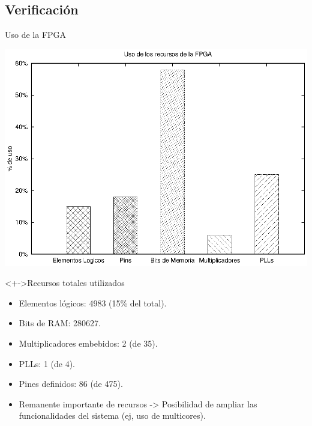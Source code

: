 \documentclass[xcolor=dvipsnames]{beamer}
\begin{document}
\subsection{Verificación}
\begin{frame}{Uso de la FPGA}

	\center	
	\includegraphics[scale=0.30]{figures/fpga.eps}  
	

   \begin{block}<+->{Recursos totales utilizados}	
    \begin{itemize}
	\scriptsize
     	\item Elementos lógicos: 4983 (15\% del total).
	\item Bits de RAM: 280627.
	\item Multiplicadores embebidos: 2 (de 35).
	\item PLLs: 1 (de 4).
	\item Pines definidos: 86 (de 475).
	\item Remanente importante de recursos -> Posibilidad de ampliar las funcionalidades del sistema (ej, uso de multicores).
    \end{itemize}	
  \end{block}


\end{frame}
\end{document}
